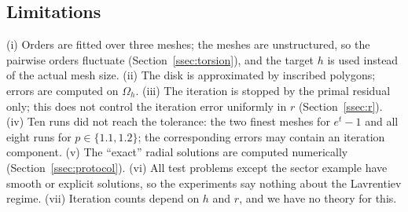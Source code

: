 \documentclass[11pt]{amsart}
\theoremstyle{definition}
\theoremstyle{remark}
\numberwithin{equation}{section}
\begin{document}
\subsection{Limitations}\label{ssec:limitations}
(i) Orders are fitted over three meshes; the meshes are unstructured, so the pairwise orders fluctuate (Section~\ref{ssec:torsion}), and the target $h$ is used instead of the actual mesh size. (ii) The disk is approximated by inscribed polygons; errors are computed on $\Omega_h$. (iii) The iteration is stopped by the primal residual only; this does not control the iteration error uniformly in $r$ (Section~\ref{ssec:r}). (iv) Ten runs did not reach the tolerance: the two finest meshes for $e^t-1$ and all eight runs for $p\in\{1.1,1.2\}$; the corresponding errors may contain an iteration component. (v) The ``exact'' radial solutions are computed numerically (Section~\ref{ssec:protocol}). (vi) All test problems except the sector example have smooth or explicit solutions, so the experiments say nothing about the Lavrentiev regime. (vii) Iteration counts depend on $h$ and $r$, and we have no theory for this.

\end{document}
